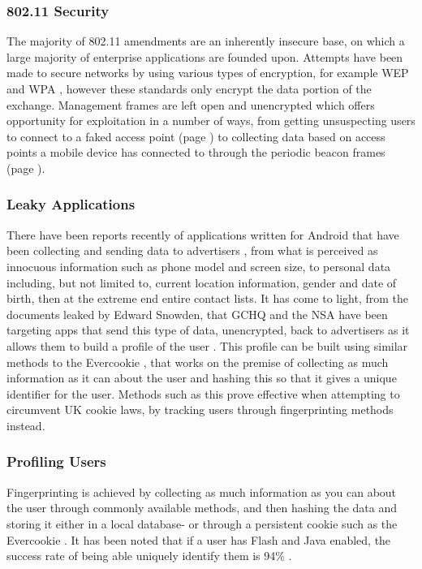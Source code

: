 \subsubsection{802.11 Security}

The majority of 802.11 amendments are an inherently insecure \cite{intro:80211_lecture} base, on which a large majority of enterprise applications are founded upon. Attempts have been made to secure networks by using various types of encryption, for example WEP \cite{intro:netgear_wep} and WPA \cite{intro:wiki_wpa}, however these standards only encrypt the data portion of the exchange. Management frames are left open and unencrypted which offers opportunity for exploitation in a number of ways, from getting unsuspecting users to connect to a faked access point (page \pageref{sec:spoofap}) to collecting data based on access points a mobile device has connected to through the periodic beacon frames (page \pageref{sec:honeypot}).
 
\subsubsection{Leaky Applications}
\label{intro:leaked-data}
There have been reports recently of applications written for Android that have been collecting and sending data to advertisers  \cite{intro:bbc_flashlight_app}, from what is perceived as innocuous information such as phone model and screen size, to personal data including, but not limited to, current location information, gender and date of birth, then at the extreme end entire contact lists. It has come to light, from the documents leaked by Edward Snowden, that GCHQ and the NSA have been targeting apps that send this type of data, unencrypted, back to advertisers as it allows them to build a profile of the user \cite{intro:angry_leak}. This profile can be built using similar methods to the Evercookie \cite{intro:evercookie}, that works on the premise of collecting as much information as it can about the user and hashing this so that it gives a unique identifier for the user. Methods such as this prove effective when attempting to circumvent UK cookie laws, by tracking users through fingerprinting methods instead.

\subsubsection{Profiling Users}

Fingerprinting is achieved by collecting as much information as you can about the user through commonly available methods, and then hashing the data and storing it either in a local database- or through a persistent cookie such as the Evercookie \cite{intro:evercookie}. It has been noted that if a user has Flash and Java enabled, the success rate of being able uniquely identify them is 94\% \cite{intro:unique_browser}. 

